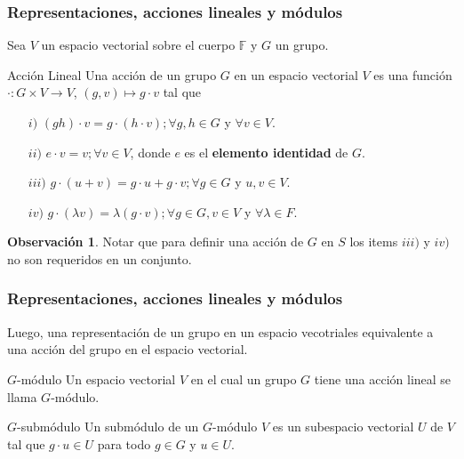     \begin{frame}
	\frametitle{Representaciones, acciones lineales y m\'odulos}
	Sea $V$ un espacio vectorial sobre el cuerpo $\mathbb{F}$ y $G$ un grupo.
	\begin{block}{Acción Lineal}
		Una acción de un grupo $G$ en un espacio vectorial $V$ es una función 
		$\cdot : G \times V \to V$, $(g, v) \mapsto g \cdot v $  tal que
		\begin{itemize}
			\item[$i)$] $(gh)\cdot v = g \cdot (h \cdot v); \forall g, h \in G$ y $\forall v \in V$.
			\item[$ii)$] $e \cdot v = v; \forall v \in V$, donde $e$ es el \textbf{elemento identidad} de $G$.
			\item[$iii)$] $g \cdot (u+v) = g \cdot u + g \cdot v; \forall g \in G$ y $u,v \in V$.
			\item[$iv)$] $g \cdot (\lambda v) = \lambda(g \cdot v); \forall  g \in G, v \in V$ y $\forall \lambda \in F$.
		\end{itemize}
	\end{block}
	\textbf{Observación 1}. Notar que para definir una acción de $G$ en $S$ 
	los items $iii)$ y $iv)$ no son requeridos en un conjunto.
    \end{frame}

    \begin{frame}
	\frametitle{Representaciones, acciones lineales y m\'odulos}
	Luego, una representaci\'on de un grupo en un espacio vecotriales equivalente a una acci\'on del
	grupo en el espacio vectorial.
	\begin{block}{$G$-m\'odulo}
		Un espacio vectorial $V$ en el cual un grupo $G$ tiene una acci\'on lineal se llama $G$-m\'odulo.
	\end{block}
    \begin{block}{$G$-subm\'odulo}
    	Un subm\'odulo de un $G$-m\'odulo $V$ es un subespacio vectorial $U$ de $V$ tal que
    	$g \cdot u \in U$ para todo $g \in G$ y $u \in U$.
    \end{block}
    \end{frame}

